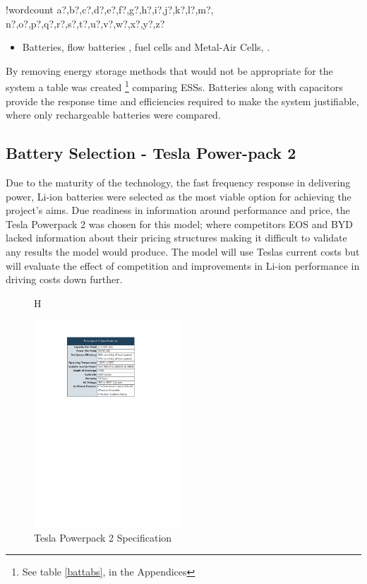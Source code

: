 \documentclass[fontsize=9.5pt]{extarticle}
\numberwithin{figure}{section} %
\providecommand{\tightlist}{%
  \setlength{\itemsep}{0pt}\setlength{\parskip}{0pt}}
\newcounter{words}
\newenvironment{counted}{%
  \setcounter{words}{0}
  \SearchList!{wordcount}{\stepcounter{words}}
    {a?,b?,c?,d?,e?,f?,g?,h?,i?,j?,k?,l?,m?,
    n?,o?,p?,q?,r?,s?,t?,u?,v?,w?,x?,y?,z?}
  \UndoBoundary{'}
  \SearchOrder{p;}}{%
  \StopSearching}
\begin{document}
\begin{counted}
\begin{itemize}
  \begin{itemize}
  \tightlist
  \item
    Batteries, flow batteries \cite{flowbatstan}, fuel cells and
    Metal-Air Cells\cite{Chen2009291}, \cite{batuni}.
  \end{itemize}
\end{itemize}

By removing energy storage methods that would not be appropriate for the
system a table was created
\footnote{See table \ref{battabs}, in the Appendices} comparing ESSs.
Batteries along with capacitors provide the response time
\cite{Choudar201521} and efficiencies required to make the system
justifiable, where only rechargeable batteries were compared.

\subsection{Battery Selection - Tesla Power-pack
2}\label{battery-selection---tesla-power-pack-2}

Due to the maturity of the technology, the fast frequency response in
delivering power, Li-ion batteries were selected as the most viable
option for achieving the project's aims. Due readiness in information
around performance and price, the Tesla Powerpack 2 was chosen for this
model; where competitors EOS and BYD lacked information about their
pricing structures making it difficult to validate any results the model
would produce. The model will use Teslas current costs but will evaluate
the effect of competition and improvements in Li-ion performance in
driving costs down further.

\begin{figure}{H}
\caption{Tesla Powerpack 2 Specification}
  \centering
     \includegraphics[trim = 0 0 0 0, clip, width=0.49\textwidth]{PP2spec.pdf}
\end{figure}


\end{counted}
\end{document}

